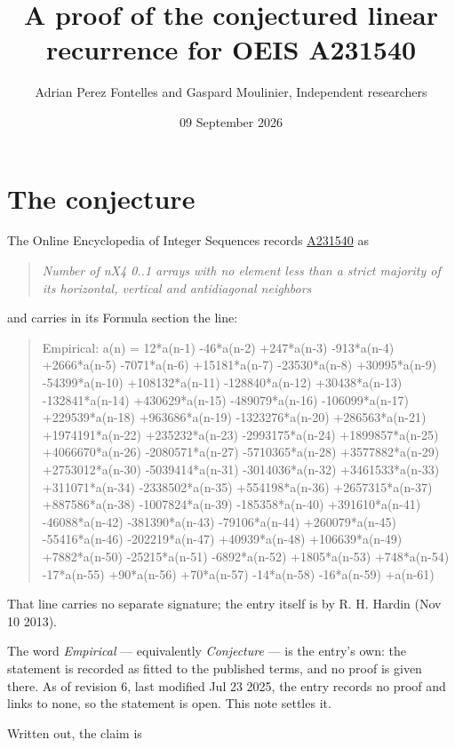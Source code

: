 \documentclass[11pt]{article}
\title{A proof of the conjectured linear recurrence for OEIS A231540}
\author{Adrian Perez Fontelles and Gaspard Moulinier, Independent researchers}
\date{09 September 2026}
\theoremstyle{definition}
\begin{document}
\maketitle
\section{The conjecture}

The Online Encyclopedia of Integer Sequences records \href{https://oeis.org/A231540}{A231540} as

\begin{quote}\itshape Number of nX4 0..1 arrays with no element less than a strict majority of its horizontal, vertical and antidiagonal neighbors\end{quote}

and carries in its Formula section the line:

\begin{quote}\ttfamily Empirical: a(n) = 12*a(n-1) -46*a(n-2) +247*a(n-3) -913*a(n-4) +2666*a(n-5) -7071*a(n-6) +15181*a(n-7) -23530*a(n-8) +30995*a(n-9) -54399*a(n-10) +108132*a(n-11) -128840*a(n-12) +30438*a(n-13) -132841*a(n-14) +430629*a(n-15) -489079*a(n-16) -106099*a(n-17) +229539*a(n-18) +963686*a(n-19) -1323276*a(n-20) +286563*a(n-21) +1974191*a(n-22) +235232*a(n-23) -2993175*a(n-24) +1899857*a(n-25) +4066670*a(n-26) -2080571*a(n-27) -5710365*a(n-28) +3577882*a(n-29) +2753012*a(n-30) -5039414*a(n-31) -3014036*a(n-32) +3461533*a(n-33) +311071*a(n-34) -2338502*a(n-35) +554198*a(n-36) +2657315*a(n-37) +887586*a(n-38) -1007824*a(n-39) -185358*a(n-40) +391610*a(n-41) -46088*a(n-42) -381390*a(n-43) -79106*a(n-44) +260079*a(n-45) -55416*a(n-46) -202219*a(n-47) +40939*a(n-48) +106639*a(n-49) +7882*a(n-50) -25215*a(n-51) -6892*a(n-52) +1805*a(n-53) +748*a(n-54) -17*a(n-55) +90*a(n-56) +70*a(n-57) -14*a(n-58) -16*a(n-59) +a(n-61)\end{quote}

That line carries no separate signature; the entry itself is by R. H. Hardin (Nov 10 2013).

The word {\itshape Empirical} --- equivalently {\itshape Conjecture} --- is the entry's own: the statement is recorded as fitted to the published terms, and no proof is given there. As of revision 6, last modified Jul 23 2025, the entry records no proof and links to none, so the statement is open. This note settles it.

Written out, the claim is
\end{document}
